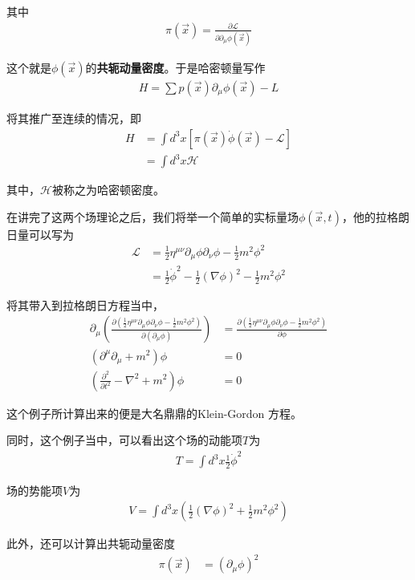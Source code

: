 \documentclass{article}
\begin{document}
其中
\begin{align*}
    \pi(\vec{x})=\frac{\partial \mathcal{L}}{\partial \partial_\mu\phi(\vec{x})}
\end{align*}

这个就是$\phi(\vec{x})$的\textbf{共轭动量密度}。于是哈密顿量写作
\begin{align*}
    H=\sum p(\vec{x})\partial_\mu\phi(\vec{x})-L
\end{align*}

将其推广至连续的情况，即
\begin{align*}
    H&=\int d^3x \left[\pi(\vec{x})\dot{\phi}(\vec{x})-\mathcal{L}\right]\\
    &=\int d^3x \mathcal{H}
\end{align*}

其中，$\mathcal{H}$被称之为哈密顿密度。


在讲完了这两个场理论之后，我们将举一个简单的实标量场$\phi(\vec{x},t)$，他的拉格朗日量可以写为
\begin{align*}
    \mathcal{L}&=\frac{1}{2}\eta^{\mu\nu}\partial_\mu\phi\partial_\nu\phi-\frac{1}{2}m^2\phi^2\\
    &=\frac{1}{2}\dot{\phi}^2-\frac{1}{2}(\nabla \phi)^2-\frac{1}{2}m^2\phi^2
\end{align*}

将其带入到拉格朗日方程当中，
\begin{align*}
    \partial_\mu\left(\frac{\partial(\frac{1}{2}\eta^{\mu\nu}\partial_\mu\phi\partial_\nu\phi-\frac{1}{2}m^2\phi^2)}{\partial(\partial_\mu\phi)}\right)&=\frac{\partial(\frac{1}{2}\eta^{\mu\nu}\partial_\mu\phi\partial_\nu\phi-\frac{1}{2}m^2\phi^2)}{\partial \phi}\\
    \left(\partial^\mu\partial_\mu+m^2\right)\phi&=0\\
    \left(\frac{\partial^2}{\partial t^2}-\nabla^2+m^2\right)\phi&=0
\end{align*}

这个例子所计算出来的便是大名鼎鼎的Klein-Gordon 方程。

同时，这个例子当中，可以看出这个场的动能项$T$为
\begin{align*}
    T=\int d^3x\frac{1}{2}\dot{\phi}^2
\end{align*}

场的势能项$V$为
\begin{align*}
    V=\int d^3x \left(\frac{1}{2}(\nabla\phi)^2+\frac{1}{2}m^2\phi^2\right)
\end{align*}

此外，还可以计算出共轭动量密度
\begin{align*}
    \pi(\vec{x})&=\left(\partial_\mu\phi\right)^2
\end{align*}
\end{document}
